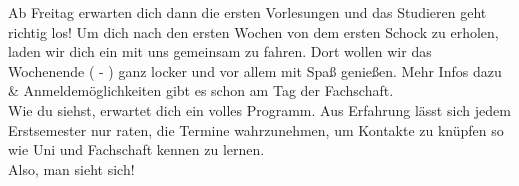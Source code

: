 Ab Freitag erwarten dich dann die ersten Vorlesungen und das Studieren geht richtig los! Um dich nach den ersten Wochen von dem ersten Schock zu erholen, laden wir dich ein mit uns gemeinsam \excursionDestination zu fahren. Dort wollen wir das Wochenende (\makeDate{\firstDayOfExcursion} - \makeDate{\lastDayOfExcursion}) ganz locker und vor allem mit Spaß genießen. Mehr Infos dazu & Anmeldemöglichkeiten gibt es schon am Tag der Fachschaft.\\

Wie du siehst, erwartet dich ein volles Programm. Aus Erfahrung lässt sich jedem Erstsemester nur raten, die Termine wahrzunehmen, um Kontakte zu knüpfen so wie Uni und Fachschaft kennen zu lernen.\\

Also, man sieht sich!